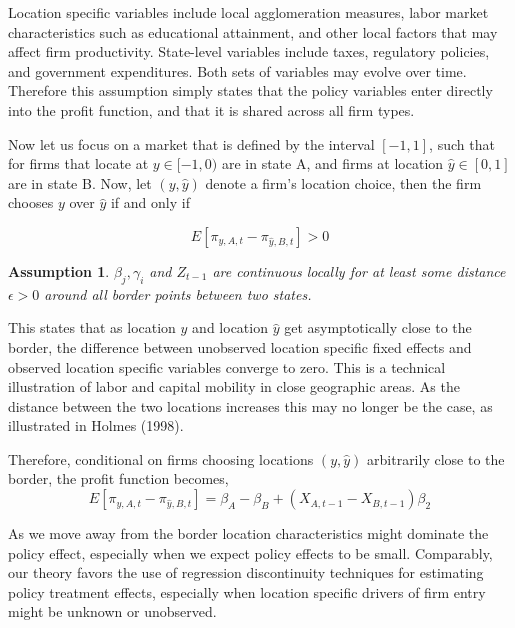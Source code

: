 \documentclass[12pt,a4paper]{article}
\newtheorem{assumption}[theorem]{Assumption}
\begin{document}
Location specific variables include local agglomeration measures, labor market characteristics such as educational attainment, and other local factors that may affect firm productivity. State-level variables include taxes, regulatory policies, and government expenditures. Both sets of variables may evolve over time. Therefore this assumption simply states that the policy variables enter directly into the profit function, and that it is shared across all firm types. 

Now let us focus on a market that is defined by the interval $[-1,1]$, such that for firms that locate at $y \in [-1,0)$ are in state A, and firms at location $\hat y \in [0,1]$ are in state B. Now, let $(y, \hat y)$ denote a firm's location choice, then the firm chooses $y$ over $\hat y$ if and only if 

\begin{equation}\label{diff}
E[\pi_{y,A,t}-\pi_{\hat y,B,t}] > 0
\end{equation}

\begin{assumption}\label{cont}
$\beta_{j}, \gamma_{i}$ and $Z_{t-1}$ are continuous locally for at least some distance $\epsilon > 0$ around all border points between two states.
\end{assumption}

This states that as location $y$ and location $\hat y$  get asymptotically close to the border, the difference between unobserved location specific fixed effects and observed location specific variables converge to zero. This is a technical illustration of labor and capital mobility in close geographic areas. As the distance between the two locations increases this may no longer be the case, as illustrated in Holmes (1998). 

Therefore, conditional on firms choosing locations $(y,\hat y)$ arbitrarily close to the border, the profit function becomes,
\begin{equation}\label{prof}
E[\pi_{y,A,t}-\pi_{\hat y, B, t}] =  \beta_{A}-\beta_{B}+(X_{A,t-1}-X_{B,t-1})\beta_{2}
\end{equation}

As we move away from the border location characteristics might dominate the policy effect, especially when we expect policy effects to be small. Comparably, our theory favors the use of regression discontinuity techniques for estimating policy treatment effects, especially when location specific drivers of firm entry might be unknown or unobserved.
\end{document}
